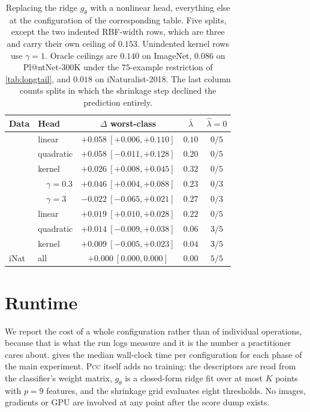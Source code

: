 \begin{table}[h]
\centering
\small
\setlength{\tabcolsep}{3pt}
\begin{tabular}{@{}llccc@{}}
\toprule
Data & Head & $\Delta$ worst-class & $\bar\lambda$ & $\hat\lambda{=}0$ \\
\midrule
{}
 & linear    & $\mathbf{+0.058}\ [+0.006,+0.110]$ & $0.10$ & $0/5$ \\
 & quadratic & $+0.058\ [-0.011,+0.128]$ & $0.20$ & $0/5$ \\
 & kernel    & $+0.026\ [+0.008,+0.045]$ & $0.32$ & $0/5$ \\
 & \ \ $\gamma{=}0.3$ & $+0.046\ [+0.004,+0.088]$ & $0.23$ & $0/3$ \\
 & \ \ $\gamma{=}3$   & $-0.022\ [-0.065,+0.021]$ & $0.27$ & $0/3$ \\
\midrule
{}
 & linear    & $\mathbf{+0.019}\ [+0.010,+0.028]$ & $0.22$ & $0/5$ \\
 & quadratic & $+0.014\ [-0.009,+0.038]$ & $0.06$ & $3/5$ \\
 & kernel    & $+0.009\ [-0.005,+0.023]$ & $0.04$ & $3/5$ \\
\midrule
iNat & all & $+0.000\ [0.000,0.000]$ & $0.00$ & $5/5$ \\
\bottomrule
\end{tabular}
\caption{Replacing the ridge $g_\theta$ with a nonlinear head, everything else at the
configuration of the corresponding table. Five splits, except the two indented RBF-width rows,
which are three and carry their own ceiling of $0.153$. Unindented kernel rows use $\gamma=1$.
Oracle ceilings are $0.140$ on ImageNet, $0.086$ on Pl@ntNet-300K under the $75$-example
restriction of \cref{tab:longtail}, and $0.018$ on iNaturalist-2018. The last column counts
splits in which the shrinkage step declined the prediction entirely.}
\label{tab:heads}
\end{table}

\section{Runtime}
\label{app:runtime}

We report the cost of a whole configuration rather than of individual operations, because
that is what the run logs measure and it is the number a practitioner cares about.
 gives the median wall-clock time per configuration for each phase of the main
experiment. \textsc{Pcc} itself adds no training: the descriptors are read from the classifier's
weight matrix, $g_\theta$ is a closed-form ridge fit over at most $K$ points with $p=9$
features, and the shrinkage grid evaluates eight thresholds. No images, gradients or GPU are
involved at any point after the score dump exists.

